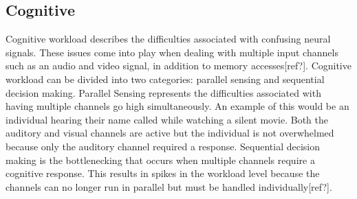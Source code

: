 \subsection{Cognitive}
Cognitive workload describes the difficulties associated with confusing neural signals. These issues come into play when dealing with multiple input channels such as an audio and video signal, in addition to memory accesses[ref?]. Cognitive workload can be divided into two categories: parallel sensing and sequential decision making. Parallel Sensing represents the difficulties associated with having multiple channels go high simultaneously. An example of this would be an individual hearing their name called while watching a silent movie. Both the auditory and visual channels are active but the individual is not overwhelmed because only the auditory channel required a response. Sequential decision making is the bottlenecking that occurs when multiple channels require a cognitive response. This results in spikes in the workload level because the channels can no longer run in parallel but must be handled individually[ref?].